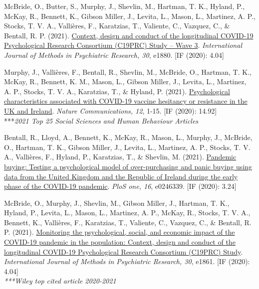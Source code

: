 \documentclass[12pt]{article}
\begin{document}
\begin{bibenum}
\item McBride, O., Butter, S., Murphy, J., 
	Shevlin, M., Hartman, T. K., Hyland, P., 
	McKay, R., Bennett, K., Gibson Miller, J.,  
	Levita, L., Mason, L., Martinez, A. P.,  
	Stocks, T. V. A., Vallières, F., Karatzias, T., 
	Valiente, C., Vazquez, C., \& Bentall, R. P. (2021). 
	\href{https://doi.org/10.1002/mpr.1880}
	{Context, design and conduct of the 
	longitudinal COVID-19 Psychological 
	Research Consortium (C19PRC) Study – Wave 3}.  
	\emph{International Journal of Methods in 
	Psychiatric Research, 30}, e1880. [IF (2020): 4.04]
		
\item Murphy, J., Vallières, F., Bentall, R., 
	Shevlin, M.,  McBride, O., Hartman, T. K., 
	McKay, R., Bennett, K. M., Mason, L.,  
	Gibson Miller, J., Levita, L., Martinez, A. P., 
	Stocks, T. V. A.,  Karatzias, T., \& Hyland, P. 
	(2021).
	\href{https://doi.org/10.1038/s41467-020-20226-9}
	{Psychological characteristics associated with 
	COVID-19 vaccine hesitancy or resistance in 
	the UK and Ireland}. 
	\emph{Nature Communications, 12}, 1-15. 
	[IF (2020): 14.92]\\
	\****\textit{2021 Top 25 Social Sciences and Human Behaviour Articles}

\item Bentall, R., Lloyd, A., Bennett, K., 
	McKay, R., Mason, L., Murphy, J., 
	McBride, O., Hartman, T. K., Gibson Miller, J., 
	Levita, L., Martinez, A. P., Stocks, T. V. A., 
	Vallières, F., Hyland, P., Karatzias, T., 
	\& Shevlin, M. (2021). 
	\href{https://doi.org/10.1371/journal.pone.0246339}
	{Pandemic buying: Testing a psychological 
	model of over-purchasing and panic buying 
	using data from the United Kingdom and 
	the Republic of Ireland during the early 
	phase of the COVID-19 pandemic}.
	\emph{PloS one, 16}, e0246339. [IF (2020): 3.24]
	
\item McBride, O., Murphy, J., Shevlin, M., 
	Gibson Miller, J., Hartman, T. K., Hyland, P., 
	Levita, L., Mason, L., Martinez, A. P., 
	McKay, R., Stocks, T. V. A., Bennett, K., 
	Vallières, F., Karatzias, T., Valiente, C., 
	Vazquez, C., \& Bentall, R. P. (2021). 
	\href{https://doi.org/10.1002/mpr.1861}
	{Monitoring the psychological, social, and 
	economic impact of the COVID-19 pandemic in 
	the population: Context, design and conduct 
	of the longitudinal COVID-19 Psychological 
	Research Consortium (C19PRC) Study}.
	\emph{International Journal of Methods in 
	Psychiatric Research, 30}, e1861. [IF (2020): 4.04]\\
	\textit{***Wiley top cited article 2020-2021}
	

\end{bibenum}
\end{document}
